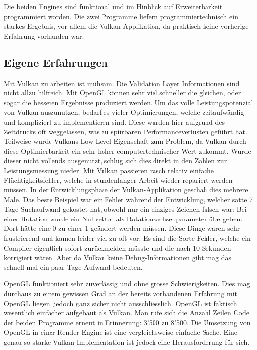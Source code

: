 \documentclass[titlepage, 11pt, a4paper, ngerman]{article}
\begin{document}
Die beiden Engines sind funktional und im Hinblick auf Erweiterbarkeit programmiert worden. Die zwei Programme liefern programmiertechnisch ein starkes Ergebnis, vor allem die Vulkan-Applikation, da praktisch keine vorherige Erfahrung vorhanden war.

\subsection{Eigene Erfahrungen}
Mit Vulkan zu arbeiten ist mühsam. Die Validation Layer Informationen sind nicht allzu hilfreich. Mit \acrshort{OpenGL} können sehr viel schneller die gleichen, oder sogar die besseren Ergebnisse produziert werden. Um das volle Leistungspotenzial von Vulkan auszunutzen, bedarf es vieler Optimierungen, welche zeitaufwändig und kompliziert zu implementieren sind. Diese wurden hier aufgrund des Zeitdrucks oft weggelassen, was zu spürbaren Performanceverlusten geführt hat. Teilweise wurde Vulkans Low-Level-Eigenschaft zum Problem, da Vulkan durch diese Optimierbarkeit ein sehr hoher computertechnischer Wert zukommt. Wurde dieser nicht vollends ausgenutzt, schlug sich dies direkt in den Zahlen zur Leistungsmessung nieder. Mit Vulkan passieren rasch relativ einfache Flüchtigkeitsfehler, welche in stundenlanger Arbeit wieder repariert werden müssen. In der Entwicklungsphase der Vulkan-Applikation geschah dies mehrere Male. Das beste Beispiel war ein Fehler während der Entwicklung, welcher satte 7 Tage Suchaufwand gekostet hat, obwohl nur ein einziges Zeichen falsch war: Bei einer Rotation wurde ein Nullvektor als Rotationsachsenparameter übergeben. Dort hätte eine 0 zu einer 1 geändert werden müssen. Diese Dinge waren sehr frustrierend und kamen leider viel zu oft vor. Es sind die Sorte Fehler, welche ein \gls{Compiler} eigentlich sofort zurückmelden müsste und die nach 10 Sekunden korrigiert wären. Aber da Vulkan keine Debug-Informationen gibt mag das schnell mal ein paar Tage Aufwand bedeuten.\par
\acrshort{OpenGL} funktioniert sehr zuverlässig und ohne grosse Schwierigkeiten. Dies mag durchaus zu einem gewissen Grad an der bereits vorhandenen Erfahrung mit \acrshort{OpenGL} liegen, jedoch ganz sicher nicht ausschliesslich. \acrshort{OpenGL} ist faktisch wesentlich einfacher aufgebaut als Vulkan. Man rufe sich die Anzahl Zeilen Code der beiden Programme erneut in Erinnerung: 3'500 zu 8'500. Die Umsetzung von \acrshort{OpenGL} in einer Render-\gls{Engine} ist eine vergleichsweise einfache Sache. Eine genau so starke Vulkan-Implementation ist jedoch eine Herausforderung für sich.\par
\end{document}
